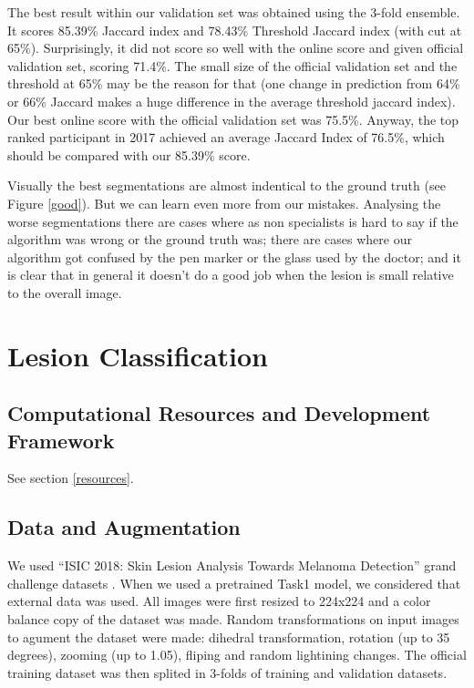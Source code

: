 \documentclass[conference]{IEEEtran}
\begin{document}
The best result within our validation set was obtained using the 3-fold ensemble.  It scores 85.39\% Jaccard index and 78.43\% Threshold Jaccard index (with cut at 65\%). Surprisingly, it did not score so well with the online score and given official validation set, scoring 71.4\%.  The small size of the official validation set and the threshold at 65\% may be the reason for that (one change in prediction from 64\% or 66\% Jaccard makes a huge difference in the average threshold jaccard index). Our best online score with the official validation set was 75.5\%. Anyway, the top ranked participant in 2017 achieved an average Jaccard Index of 76.5\%, which should be compared with our 85.39\% score.

Visually the best segmentations are almost indentical to the ground truth (see Figure \ref{good}). But we can learn even more from our mistakes. Analysing the worse segmentations there are cases where as non specialists is hard to say if the algorithm was wrong or the ground truth was; there are cases where our algorithm got confused by the pen marker or the glass used by the doctor; and it is clear that in general it doesn't do a good job when the lesion is small relative to the overall image. 

\section{Lesion Classification}
\label{classification}
\subsection{Computational Resources and Development Framework}
See section \ref{resources}.
\subsection{Data and Augmentation}
We used “ISIC 2018: Skin Lesion Analysis Towards Melanoma Detection” grand challenge datasets \cite{codella, ham}. When we used a pretrained Task1 model, we considered that external data was used. All images were first resized to 224x224 and a color balance copy of the dataset was made. Random transformations on input images to agument the dataset were made: dihedral transformation, rotation (up to 35 degrees), zooming (up to 1.05), fliping and random lightining changes. The official training dataset was then splited in 3-folds of training and validation datasets.  
\end{document}
